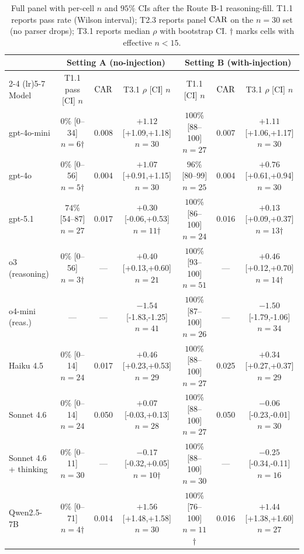 \begin{table}[h]
\centering
\caption{Full panel with per-cell $n$ and $95\%$ CIs after the Route B-1 reasoning-fill. T1.1 reports pass rate (Wilson interval); T2.3 reports panel $\mathrm{CAR}$ on the $n{=}30$ set (no parser drops); T3.1 reports median $\rho$ with bootstrap CI. $\dagger$ marks cells with effective $n{<}15$.}
\label{tab:full-panel}
\scriptsize
\setlength{\tabcolsep}{3pt}
\begin{tabular}{lccc|ccc}
\toprule
& \multicolumn{3}{c}{Setting A (no-injection)} & \multicolumn{3}{c}{Setting B (with-injection)} \\
\cmidrule(lr){2-4} \cmidrule(lr){5-7}
Model & T1.1 pass [CI] $n$ & $\mathrm{CAR}$ & T3.1 $\rho$ [CI] $n$ & T1.1 [CI] $n$ & $\mathrm{CAR}$ & T3.1 $\rho$ [CI] $n$ \\
\midrule
gpt-4o-mini      & $0\%$ [0--34] $n{=}6$$\dagger$    & 0.008 & $+1.12$ [+1.09,+1.18] $n{=}30$  & $100\%$ [88--100] $n{=}27$ & 0.007 & $+1.11$ [+1.06,+1.17] $n{=}30$  \\
gpt-4o           & $0\%$ [0--56] $n{=}5$$\dagger$    & 0.004 & $+1.07$ [+0.91,+1.15] $n{=}30$  & $96\%$ [80--99]   $n{=}25$ & 0.004 & $+0.76$ [+0.61,+0.94] $n{=}30$  \\
gpt-5.1          & $74\%$ [54--87] $n{=}27$          & 0.017 & $+0.30$ [-0.06,+0.53] $n{=}11$$\dagger$ & $100\%$ [86--100] $n{=}24$ & 0.016 & $+0.13$ [+0.09,+0.37] $n{=}13$$\dagger$  \\
o3 (reasoning)   & $0\%$ [0--56] $n{=}3$$\dagger$    & ---   & $+0.40$ [+0.13,+0.60] $n{=}21$  & $100\%$ [93--100] $n{=}51$ & ---   & $+0.46$ [+0.12,+0.70] $n{=}14$$\dagger$  \\
o4-mini (reas.)  & ---                               & ---   & $-1.54$ [-1.83,-1.25] $n{=}41$    & $100\%$ [87--100] $n{=}26$ & ---   & $-1.50$ [-1.79,-1.06] $n{=}34$  \\
Haiku 4.5        & $0\%$ [0--14] $n{=}24$            & 0.017 & $+0.46$ [+0.23,+0.53] $n{=}29$  & $100\%$ [88--100] $n{=}27$ & 0.025 & $+0.34$ [+0.27,+0.37] $n{=}29$  \\
Sonnet 4.6       & $0\%$ [0--14] $n{=}24$            & 0.050 & $+0.07$ [-0.03,+0.13] $n{=}28$  & $100\%$ [88--100] $n{=}27$ & 0.050 & $-0.06$ [-0.23,-0.01] $n{=}30$  \\
Sonnet 4.6 + thinking & $0\%$ [0--11] $n{=}30$       & ---   & $-0.17$ [-0.32,+0.05] $n{=}10$$\dagger$ & $100\%$ [88--100] $n{=}30$ & ---   & $-0.25$ [-0.34,-0.11] $n{=}16$  \\
Qwen2.5-7B       & $0\%$ [0--71] $n{=}4$$\dagger$    & 0.014 & $+1.56$ [+1.48,+1.58] $n{=}30$  & $100\%$ [76--100] $n{=}11$$\dagger$ & 0.016 & $+1.44$ [+1.38,+1.60] $n{=}27$  \\
\bottomrule
\end{tabular}
\end{table}

